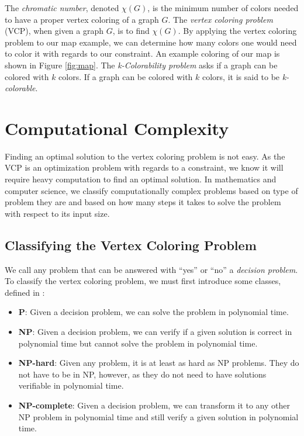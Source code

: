 \documentclass{article}
\theoremstyle{definition}
\begin{document}
The \emph{chromatic number}, denoted $\chi(G)$, is the minimum number of colors needed to have a proper vertex coloring of a graph $G$. The \emph{vertex coloring problem} (VCP), when given a graph $G$, is to find $\chi(G)$. By applying the vertex coloring problem to our map example, we can determine how many colors one would need to color it with regards to our constraint. An example coloring of our map is shown in Figure \ref{fig:map}. The \emph{k-Colorability problem} asks if a graph can be colored with $k$ colors. If a graph can be colored with $k$ colors, it is said to be \emph{k-colorable}.

\section{Computational Complexity}\label{sec:complexity}
Finding an optimal solution to the vertex coloring problem is not easy. As the VCP is an optimization problem with regards to a constraint, we know it will require heavy computation to find an optimal solution. In mathematics and computer science, we classify computationally complex problems based on type of problem they are and based on how many steps it takes to solve the problem with respect to its input size.

\subsection{Classifying the Vertex Coloring Problem}
We call any problem that can be answered with ``yes'' or ``no'' a \emph{decision problem}. To classify the vertex coloring problem, we must first introduce some classes, defined in \cite{moret}:

\begin{itemize}
  \item \textbf{P}: Given a decision problem, we can solve the problem in polynomial time.
  \item \textbf{NP}: Given a decision problem, we can verify if a given solution is correct in polynomial time but cannot solve the problem in polynomial time.
  \item \textbf{NP-hard}: Given any problem, it is at least as hard as NP problems. They do not have to be in NP, however, as they do not need to have solutions verifiable in polynomial time.
  \item \textbf{NP-complete}: Given a decision problem, we can transform it to any other NP problem in polynomial time and still verify a given solution in polynomial time.
\end{itemize}
\end{document}

